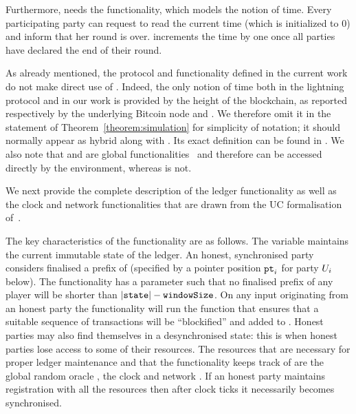     Furthermore, \ledger{} needs the \Fclock functionality,
    which models the notion of time. Every participating party can request to
    read the current time (which is initialized to 0) and inform \Fclock that
    her round is over. \Fclock increments the time by one once all parties have
    declared the end of their round.

    As already mentioned, the protocol and functionality defined in the current
    work do not make direct use of \Fclock. Indeed, the only notion of time both
    in the lightning protocol and in our work is provided by the height of the
    blockchain, as reported respectively by the underlying Bitcoin node and
    \ledger. We therefore omit it in the statement of
    Theorem~\ref{theorem:simulation} for simplicity of notation; it should
    normally appear as hybrid along with \ledger. Its exact definition can be
    found in . We also note that
    \ledger{} and \Fclock are global functionalities~\cite{globaluc} and
    therefore can be accessed directly by the environment, whereas \fpaynet{} is
    not.

  We next provide the complete description of the ledger functionality as well as the clock and network functionalities  that are
drawn from the   UC formalisation of~\cite{BMTZ17,genesis}.

  The key characteristics of the functionality are as follows. The variable
  \state maintains the current immutable state of the ledger. An honest,
  synchronised party considers finalised a prefix of \state (specified by a
  pointer position $\texttt{pt}_{i}$ for party $U_i$ below). The functionality has a
  parameter \windowSize such that no finalised prefix of any player will be
  shorter than $|\texttt{state}| - \texttt{windowSize}$. On any input originating from an honest
  party the functionality will run the \LFextend function that ensures that a
  suitable sequence of transactions will be ``blockified'' and added to \state.
  Honest parties may also find themselves in a desynchronised state: this is
  when honest parties lose access to some of their resources. The resources that
  are necessary for proper ledger maintenance and that the functionality keeps
  track of are the global random oracle \Foracle, the clock \Fclock and network
  \FnetworkEd. If an honest party maintains registration with all the resources
  then after \vdelay clock ticks it necessarily becomes synchronised.

